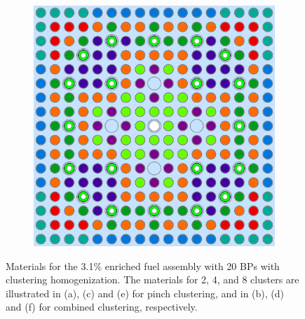 \begin{figure}[h!]
\begin{subfigure}{0.48\textwidth}
  \caption{}
  \label{fig:chap10-assm-31-20BPs-pinch-8}
\end{subfigure}%
\begin{subfigure}{0.48\textwidth}
  \centering
  \includegraphics[width=0.9\linewidth]{figures/unsupervised/geometries/with-features/8-clusters/combined/assm-31-20BPs}
  \caption{}
  \label{fig:chap10-assm-31-20BPs-combined-8}
\end{subfigure}
\caption[Materials for the 3.1\% fuel assembly with clustering homogenization]{Materials for the 3.1\% enriched fuel assembly with 20 \acp{BP} with clustering homogenization. The materials for 2, 4, and 8 clusters are illustrated in (a), (c) and (e) for pinch clustering, and in (b), (d) and (f) for combined clustering, respectively.}
\label{fig:chap10-assm-31-20BPs-geometries}
\end{figure}

\clearpage

